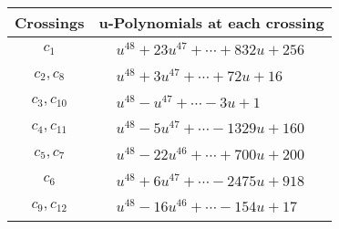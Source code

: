 \documentclass[1p]{elsarticle_modified}
\theoremstyle{definition}
\begin{document}
\begin{tabular}{m{50pt}|m{274pt}}
Crossings & \hspace{64pt}u-Polynomials at each crossing \\
\hline $$\begin{aligned}c_{1}\end{aligned}$$&$\begin{aligned}
&u^{48}+23 u^{47}+\cdots+832 u+256
\end{aligned}$\\
\hline $$\begin{aligned}c_{2},c_{8}\end{aligned}$$&$\begin{aligned}
&u^{48}+3 u^{47}+\cdots+72 u+16
\end{aligned}$\\
\hline $$\begin{aligned}c_{3},c_{10}\end{aligned}$$&$\begin{aligned}
&u^{48}- u^{47}+\cdots-3 u+1
\end{aligned}$\\
\hline $$\begin{aligned}c_{4},c_{11}\end{aligned}$$&$\begin{aligned}
&u^{48}-5 u^{47}+\cdots-1329 u+160
\end{aligned}$\\
\hline $$\begin{aligned}c_{5},c_{7}\end{aligned}$$&$\begin{aligned}
&u^{48}-22 u^{46}+\cdots+700 u+200
\end{aligned}$\\
\hline $$\begin{aligned}c_{6}\end{aligned}$$&$\begin{aligned}
&u^{48}+6 u^{47}+\cdots-2475 u+918
\end{aligned}$\\
\hline $$\begin{aligned}c_{9},c_{12}\end{aligned}$$&$\begin{aligned}
&u^{48}-16 u^{46}+\cdots-154 u+17
\end{aligned}$\\
\hline
\end{tabular}\\~\\
\newpage\renewcommand{\arraystretch}{1}
\end{document}
